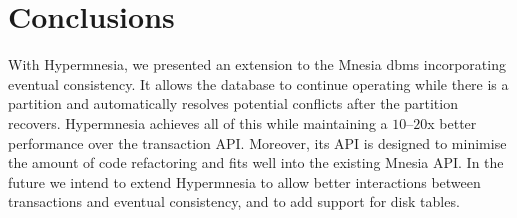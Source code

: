 \section{Conclusions} \label{sec:concl}


With Hypermnesia, we presented an extension to the Mnesia \acrshort{dbms}
incorporating eventual consistency. 
It allows the database to continue operating while there is a partition and 
automatically resolves potential conflicts after the partition recovers.
Hypermnesia achieves all of this while maintaining a \(10\)--\(20\)x better performance 
over the transaction API. Moreover, its API is designed to minimise the amount of 
code refactoring and fits well into the existing Mnesia API.
In the future we intend to extend Hypermnesia to allow better interactions between
transactions and eventual consistency, and to add support for disk tables.



